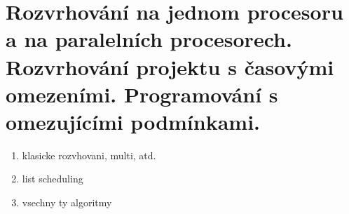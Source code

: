 \section[KO - Scheduling]{Rozvrhování na jednom procesoru a na paralelních procesorech. Rozvrhování projektu s časovými omezeními. Programování s omezujícími podmínkami.}

\begin{enumerate}
\item klasicke rozvhovani, multi, atd.
\item list scheduling
\item vsechny ty algoritmy
\end{enumerate}